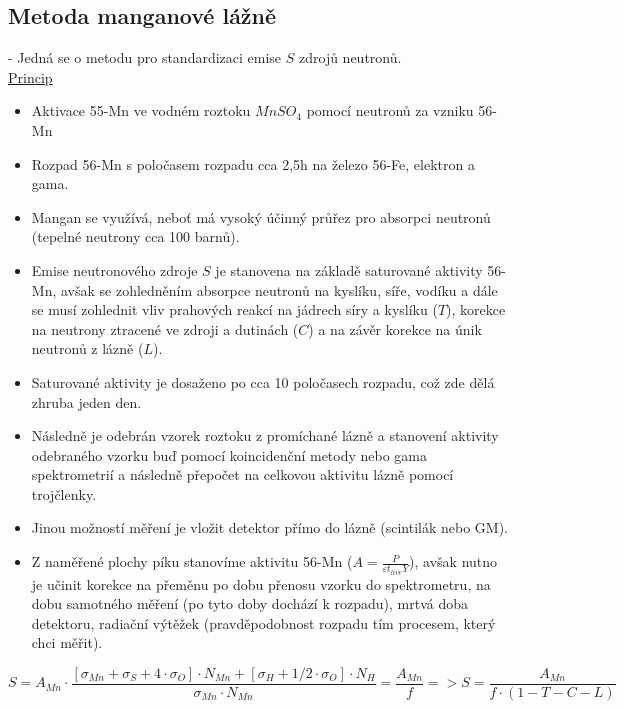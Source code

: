 \subsection{Metoda manganové lážně}

- Jedná se o metodu pro standardizaci emise $S$ zdrojů neutronů.
\\

\underline{Princip}
\begin{itemize}
    \item Aktivace 55-Mn ve vodném roztoku $MnSO_4$ pomocí neutronů za vzniku 56-Mn
    \item Rozpad 56-Mn s poločasem rozpadu cca 2,5h na železo 56-Fe, elektron a gama.
    \item Mangan se využívá, neboť má vysoký účinný průřez pro absorpci neutronů (tepelné neutrony cca 100 barnů).
    \item Emise neutronového zdroje $S$ je stanovena na základě saturované aktivity 56-Mn, avšak se zohledněním absorpce neutronů na kyslíku, síře, vodíku a dále se musí zohlednit vliv prahových reakcí na jádrech síry a kyslíku ($T$), korekce na neutrony ztracené ve zdroji a dutinách ($C$) a na závěr korekce na únik neutronů z lázně ($L$).
    \item Saturované aktivity je dosaženo po cca 10 poločasech rozpadu, což zde dělá zhruba jeden den.
    \item Následně je odebrán vzorek roztoku z promíchané lázně a stanovení aktivity odebraného vzorku buď pomocí koincidenční metody nebo gama spektrometrií a následně přepočet na celkovou aktivitu lázně pomocí trojčlenky.
    \item Jinou možností měření je vložit detektor přímo do lázně (scintilák nebo GM).
    \item Z naměřené plochy píku stanovíme aktivitu 56-Mn ($A=\frac{P}{\varepsilon t_{live} Y}$), avšak nutno je učinit korekce na přeměnu po dobu přenosu vzorku do spektrometru, na dobu samotného měření (po tyto doby dochází k rozpadu), mrtvá doba detektoru, radiační výtěžek (pravděpodobnost rozpadu tím procesem, který chci měřit).
\end{itemize}

\begin{center}
    \begin{equation}
        S = A_{Mn} \cdot \frac{[\sigma_{Mn} + \sigma_S + 4\cdot\sigma_O]\cdot N_{Mn} + [\sigma_H + 1/2 \cdot \sigma_O]\cdot N_H}{\sigma_{Mn}\cdot N_{Mn}} = \frac{A_{Mn}}{f}  =>  S = \frac{A_{Mn}}{f\cdot(1- T - C - L)}
    \end{equation}
\end{center}

